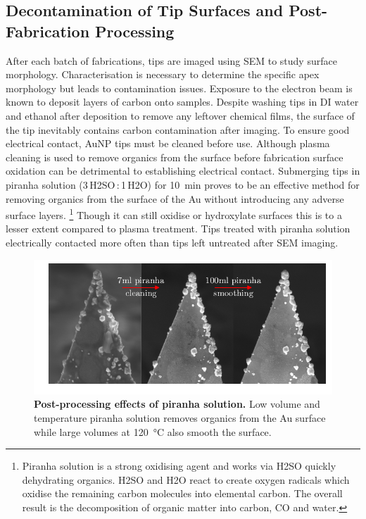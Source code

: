 \documentclass{article}
\begin{document}
\subsection{Decontamination of Tip Surfaces and Post-Fabrication Processing}

After each batch of fabrications, tips are imaged using SEM to study surface morphology. Characterisation is necessary to determine the specific apex morphology but leads to contamination issues. Exposure to the electron beam is known to deposit layers of carbon onto samples. Despite washing tips in DI water and ethanol after deposition to remove any leftover chemical films, the surface of the tip inevitably contains carbon contamination after imaging. To ensure good electrical contact, AuNP tips must be cleaned before use. Although plasma cleaning is used to remove organics from the surface before fabrication surface oxidation can be detrimental to establishing electrical contact. Submerging tips in piranha solution (3\,H\subs2SO\,:\,1\,H\subs2O) for \SI{10}{\minute} proves to be an effective method for removing organics from the surface of the Au without introducing any adverse surface layers.%
\footnote{Piranha solution is a strong oxidising agent and works via H\subs2SO quickly dehydrating organics. H\subs2SO and H\subs2O react to create oxygen radicals which oxidise the remaining carbon molecules into elemental carbon. The overall result is the decomposition of organic matter into carbon, CO and water.}
Though it can still oxidise or hydroxylate surfaces this is to a lesser extent compared to plasma treatment. Tips treated with piranha solution electrically contacted more often than tips left untreated after SEM imaging.

\begin{figure}[bt]
\centering
\includegraphics[clip=true, trim=20 20 0 0]{figures/tip_post_processing}
\caption[Post-processing effects of piranha solution.]{\textbf{Post-processing effects of piranha solution.} Low volume and temperature piranha solution removes organics from the Au surface while large volumes at \SI{120}{\celsius} also smooth the surface.}
\label{fig:tip_post_processing}
\end{figure}
\end{document}
